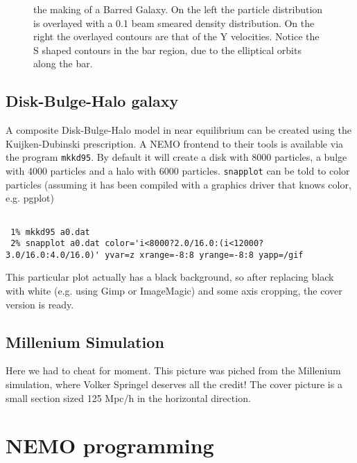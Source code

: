\begin{figure}[t]
\caption[A Barred Galaxy]
{the making of a Barred Galaxy. On the left the particle distribution
is overlayed with a 0.1 beam smeared density distribution. On the right
the overlayed contours are that of the Y velocities. Notice the S shaped
contours in the bar region, due to the elliptical orbits along the bar.
}
\end{figure}

\section{Disk-Bulge-Halo galaxy}

A composite Disk-Bulge-Halo model in near equilibrium can be created using the Kuijken-Dubinski
prescription. A NEMO frontend to their tools is available via the program {\tt mkkd95}. By
default it will create a disk with 8000 particles, a bulge with 4000 particles and a halo
with 6000 particles. {\tt snapplot} can be told to color particles (assuming it has been
compiled with a graphics driver that knows color, e.g. pgplot)

\footnotesize\begin{verbatim}

 1% mkkd95 a0.dat
 2% snapplot a0.dat color='i<8000?2.0/16.0:(i<12000?3.0/16.0:4.0/16.0)' yvar=z xrange=-8:8 yrange=-8:8 yapp=/gif

\end{verbatim}\normalsize

This particular plot actually has a black background, so after replacing black with white (e.g. using
Gimp or ImageMagic) and some axis cropping, the cover version is ready.

\section{Millenium Simulation}

Here we had to cheat for moment. This picture was piched from the Millenium simulation, where
Volker Springel deserves all the credit!   The cover picture is a small section sized
125 Mpc/h in the horizontal direction.


\chapter                {NEMO programming}

